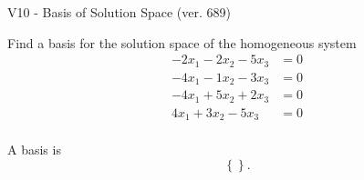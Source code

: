 \begin{exercise}
  \begin{exerciseTitle}V10 - Basis of Solution Space (ver. 689)\end{exerciseTitle}
  \begin{exerciseStatement}
    Find a basis for the solution space of the homogeneous system 
\begin{align*}
 -2 x_ 1 -2 x_ 2 -5 x_ 3 &= 0  \\ 
  -4 x_ 1 -1 x_ 2 -3 x_ 3 &= 0  \\ 
  -4 x_ 1 + 5 x_ 2 + 2 x_ 3 &= 0  \\ 
  4 x_ 1 + 3 x_ 2 -5 x_ 3 &= 0  \\ 
 \end{align*}


 
  \end{exerciseStatement}

  \begin{exerciseAnswer}
   A basis is   
\[\left\{\right\}.\]

  


  \end{exerciseAnswer}
\end{exercise}